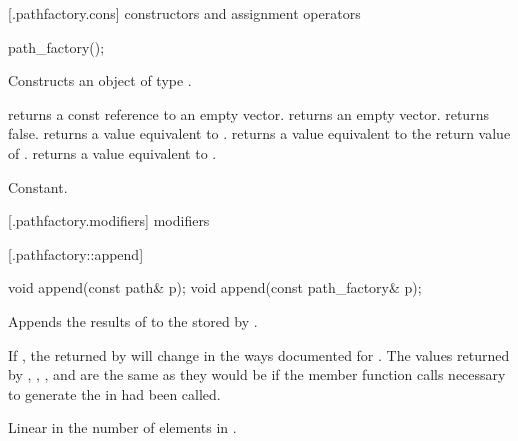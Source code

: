  [\iotwod.pathfactory.cons] { constructors and 
assignment operators}

%
\begin{itemdecl}
path_factory();
\end{itemdecl}
\begin{itemdescr}
	\pnum
	\effects
	Constructs an object of type .
	
	\pnum
	\postconditions
	 returns a const reference to an empty vector.
	 returns an empty vector.
	 returns false.
	 returns a value equivalent to .
	 returns a value equivalent to the return 
	value of .
	 returns a value equivalent to 
	.
	
	\pnum
	\complexity
	Constant.
\end{itemdescr}

 [\iotwod.pathfactory.modifiers] { modifiers}

 [\iotwod.pathfactory::append] {}

%
%
\begin{itemdecl}
void append(const path& p);
void append(const path_factory& p);
\end{itemdecl}
\begin{itemdescr}
	\pnum
	\effects
	Appends the results of  to the  stored 
	by .
	
	\pnum
	\postconditions
	If , the
	 returned by  will change in 
	the ways documented for .
	The values returned by , 
	, , and 
	 are the same as they would be if the 
	 member function calls necessary to generate the 
	 in  had been called.
	
	\pnum
	\complexity
	Linear in the number of elements in .
\end{itemdescr}


